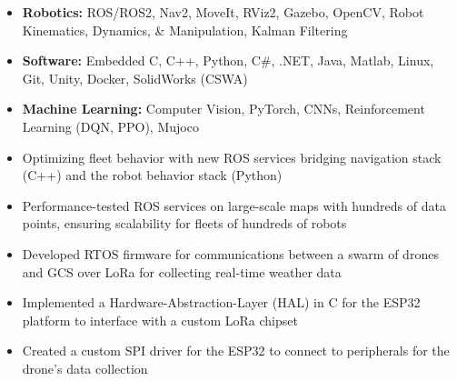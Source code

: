 \documentclass[10pt,a4paper,ragged2e,withhyper]{altacv}
\begin{document}
\tagline{}
\makecvheader


    \vspace{-1.75em}
    \vspace{-1.6em}
    \begin{itemize}
        \item[] \textbf{Robotics:} ROS/ROS2, Nav2, MoveIt, RViz2, Gazebo, OpenCV, Robot Kinematics, Dynamics, \& Manipulation, Kalman Filtering
        \item[] \textbf{Software:} Embedded C, C++, Python, C\#, .NET, Java, Matlab, Linux, Git, Unity, Docker, SolidWorks (CSWA)
        \item[] \textbf{Machine Learning:} Computer Vision, PyTorch, CNNs, Reinforcement Learning (DQN, PPO), Mujoco
    \end{itemize}
    \vspace{-1.5em}
    \begin{itemize}
        \item Optimizing fleet behavior with new ROS services bridging navigation stack (C++) and the robot behavior stack (Python)
        \item Performance-tested ROS services on large-scale maps with hundreds of data points, ensuring scalability for fleets of hundreds of robots
    \end{itemize}
    \begin{itemize}
        \item Developed RTOS firmware for communications between a swarm of drones and GCS over LoRa for collecting real-time weather data
        \item Implemented a Hardware-Abstraction-Layer (HAL) in C for the ESP32 platform to interface with a custom LoRa chipset
        \item Created a custom SPI driver for the ESP32 to connect to peripherals for the drone's data collection
    \end{itemize}
\end{document}
